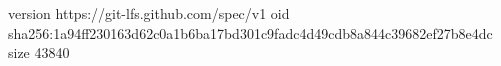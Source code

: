 version https://git-lfs.github.com/spec/v1
oid sha256:1a94ff230163d62c0a1b6ba17bd301c9fadc4d49cdb8a844c39682ef27b8e4dc
size 43840
